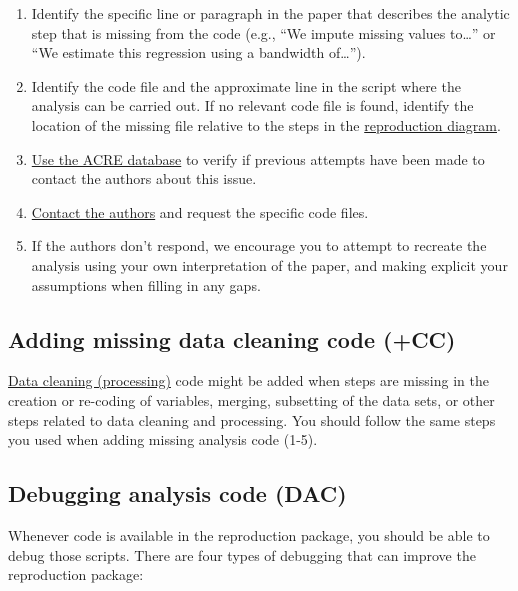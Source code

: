 \documentclass[]{book}
\begin{document}
\begin{enumerate}
\def\labelenumi{\arabic{enumi}.}
\item
  Identify the specific line or paragraph in the paper that describes the analytic step that is missing from the code (e.g., ``We impute missing values to\ldots{}'' or ``We estimate this regression using a bandwidth of\ldots{}'').
\item
  Identify the code file and the approximate line in the script where the analysis can be carried out. If no relevant code file is found, identify the location of the missing file relative to the steps in the \protect\hyperlink{diagram}{reproduction diagram}.
\item
  \href{ADD\%20LINK}{Use the ACRE database} to verify if previous attempts have been made to contact the authors about this issue.
\item
  \protect\hyperlink{tips-for-communication}{Contact the authors} and request the specific code files.
\item
  If the authors don't respond, we encourage you to attempt to recreate the analysis using your own interpretation of the paper, and making explicit your assumptions when filling in any gaps.
\end{enumerate}

\hypertarget{cc}{%
\subsection{Adding missing data cleaning code (+CC)}\label{cc}}

\protect\hyperlink{describe-inputs}{Data cleaning (processing)} code might be added when steps are missing in the creation or re-coding of variables, merging, subsetting of the data sets, or other steps related to data cleaning and processing. You should follow the same steps you used when adding missing analysis code (1-5).

\hypertarget{dac}{%
\subsection{Debugging analysis code (DAC)}\label{dac}}

Whenever code is available in the reproduction package, you should be able to debug those scripts. There are four types of debugging that can improve the reproduction package:
\end{document}
